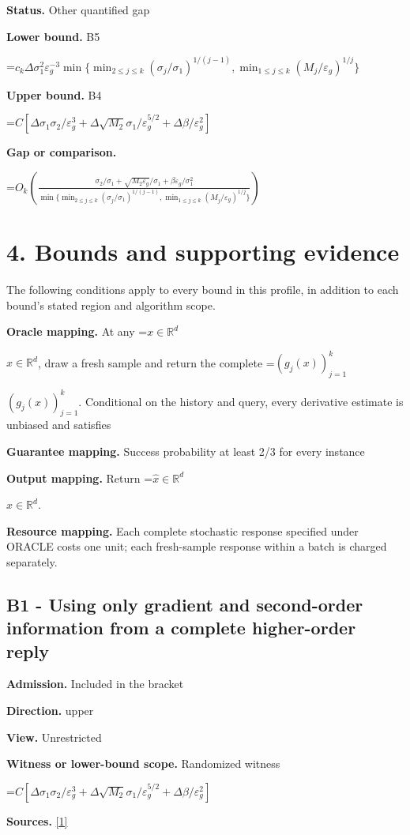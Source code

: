 \documentclass[10pt,a4paper]{article}
\newcommand{\AtlasMath}[1]{\par\begingroup\centering\setbox0=\hbox{$\displaystyle #1$}\ifdim\wd0>1.4\linewidth\typeout{ATLAS WIDE FORMULA: \the\wd0}\fi\ifdim\wd0>\linewidth\resizebox{\linewidth}{!}{\box0}\else\box0\fi\par\endgroup}
\newcommand{\AtlasInlineMath}[1]{\begingroup\setbox0=\hbox{$#1$}\ifdim\wd0>.4\linewidth\endgroup\AtlasMath{#1}\else\endgroup$#1$\fi}
\begin{document}
\textbf{Status.} Other quantified gap

\textbf{Lower bound.} B5

\AtlasMath{c_k\Delta\sigma_1^2\varepsilon_g^{-3}\min\{\min_{2\le j\le k}(\sigma_j/\sigma_1)^{1/(j-1)},\min_{1\le j\le k}(M_j/\varepsilon_g)^{1/j}\}}
\textbf{Upper bound.} B4

\AtlasMath{C[\Delta\sigma_1\sigma_2/\varepsilon_g^3+\Delta\sqrt{M_2}\sigma_1/\varepsilon_g^{5/2}+\Delta\beta/\varepsilon_g^2]}
\textbf{Gap or comparison.} 
\AtlasMath{O_k\!\left(\frac{\sigma_2/\sigma_1+\sqrt{M_2\varepsilon_g}/\sigma_1+\beta\varepsilon_g/\sigma_1^2}{\min\{\min_{2\le j\le k}(\sigma_j/\sigma_1)^{1/(j-1)},\min_{1\le j\le k}(M_j/\varepsilon_g)^{1/j}\}}\right)}


\section{4. Bounds and supporting evidence}
The following conditions apply to every bound in this profile, in addition to each bound's stated region and algorithm scope.

\textbf{Oracle mapping.} At any \AtlasInlineMath{x\in\mathbb{R}^d}, draw a fresh sample and return the complete \AtlasInlineMath{(g_j(x))_{j=1}^{k}}. Conditional on the history and query, every derivative estimate is unbiased and satisfies

\textbf{Guarantee mapping.} Success probability at least 2/3 for every instance

\textbf{Output mapping.} Return \AtlasInlineMath{\widehat{x}\in \mathbb{R}^d}.

\textbf{Resource mapping.} Each complete stochastic response specified under ORACLE costs one unit; each fresh-sample response within a batch is charged separately.

\subsection{B1 - Using only gradient and second-order information from a complete higher-order reply}
\textbf{Admission.} Included in the bracket

\textbf{Direction.} upper

\textbf{View.} Unrestricted

\textbf{Witness or lower-bound scope.} Randomized witness

\AtlasMath{C[\Delta\sigma_1\sigma_2/\varepsilon_g^3+\Delta\sqrt{M_2}\sigma_1/\varepsilon_g^{5/2}+\Delta\beta/\varepsilon_g^2]}
\textbf{Sources.} \href{https://proceedings.mlr.press/v125/arjevani20a/arjevani20a.pdf}{[1]}
\end{document}
